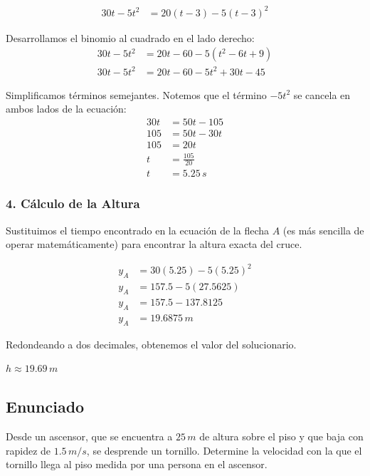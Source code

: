 \documentclass[12pt, a4paper]{article}
\begin{document}
\begin{align*}
30t - 5t^2 &= 20(t - 3) - 5(t - 3)^2
\end{align*}

Desarrollamos el binomio al cuadrado en el lado derecho:
\begin{align*}
30t - 5t^2 &= 20t - 60 - 5(t^2 - 6t + 9) \\
30t - 5t^2 &= 20t - 60 - 5t^2 + 30t - 45
\end{align*}

Simplificamos términos semejantes. Notemos que el término $-5t^2$ se cancela en ambos lados de la ecuación:
\begin{align*}
30t &= 50t - 105 \\
105 &= 50t - 30t \\
105 &= 20t \\
t &= \frac{105}{20} \\
t &= 5.25 \, \si{s}
\end{align*}

\subsubsection*{4. Cálculo de la Altura}
Sustituimos el tiempo encontrado en la ecuación de la flecha $A$ (es más sencilla de operar matemáticamente) para encontrar la altura exacta del cruce.

\begin{align*}
y_A &= 30(5.25) - 5(5.25)^2 \\
y_A &= 157.5 - 5(27.5625) \\
y_A &= 157.5 - 137.8125 \\
y_A &= 19.6875 \, \si{m}
\end{align*}

Redondeando a dos decimales, obtenemos el valor del solucionario.

\begin{tcolorbox}[colback=green!5!white, colframe=green!50!black, title=Respuesta Final]
\centering \Large $h \approx 19.69 \, \si{m}$
\end{tcolorbox}

\newpage

\subsection*{Enunciado}
Desde un ascensor, que se encuentra a $25 \, \si{m}$ de altura sobre el piso y que baja con rapidez de $1.5 \, \si{m/s}$, se desprende un tornillo. Determine la velocidad con la que el tornillo llega al piso medida por una persona en el ascensor. 
\end{document}
